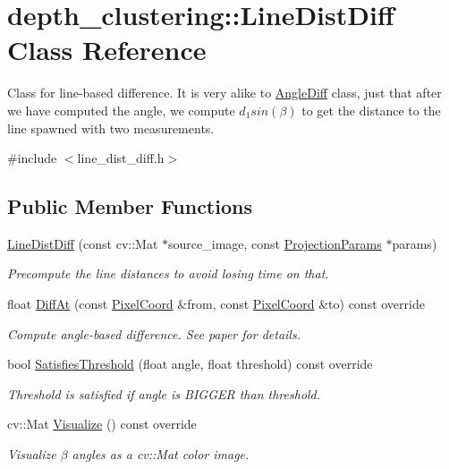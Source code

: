 \hypertarget{classdepth__clustering_1_1LineDistDiff}{}\section{depth\+\_\+clustering\+:\+:Line\+Dist\+Diff Class Reference}
\label{classdepth__clustering_1_1LineDistDiff}


Class for line-\/based difference. It is very alike to \hyperlink{classdepth__clustering_1_1AngleDiff}{Angle\+Diff} class, just that after we have computed the angle, we compute $d_1 sin(\beta)$ to get the distance to the line spawned with two measurements.  




{\ttfamily \#include $<$line\+\_\+dist\+\_\+diff.\+h$>$}

\subsection*{Public Member Functions}
\begin{DoxyCompactItemize}
\item 
\hyperlink{classdepth__clustering_1_1LineDistDiff_af922d3e19bc52a2fdbf36317fc474d88}{Line\+Dist\+Diff} (const cv\+::\+Mat $\ast$source\+\_\+image, const \hyperlink{classdepth__clustering_1_1ProjectionParams}{Projection\+Params} $\ast$params)
\begin{DoxyCompactList}\small\item\em Precompute the line distances to avoid losing time on that. \end{DoxyCompactList}\item 
float \hyperlink{classdepth__clustering_1_1LineDistDiff_a839eee44b14de26d85e6dbad5e37b356}{Diff\+At} (const \hyperlink{structdepth__clustering_1_1PixelCoord}{Pixel\+Coord} \&from, const \hyperlink{structdepth__clustering_1_1PixelCoord}{Pixel\+Coord} \&to) const override
\begin{DoxyCompactList}\small\item\em Compute angle-\/based difference. See paper for details. \end{DoxyCompactList}\item 
\mbox{\label{classdepth__clustering_1_1LineDistDiff_ae9debede2cffd6bb40ca4c4a82c52f61}} 
bool \hyperlink{classdepth__clustering_1_1LineDistDiff_ae9debede2cffd6bb40ca4c4a82c52f61}{Satisfies\+Threshold} (float angle, float threshold) const override
\begin{DoxyCompactList}\small\item\em Threshold is satisfied if angle is B\+I\+G\+G\+ER than threshold. \end{DoxyCompactList}\item 
cv\+::\+Mat \hyperlink{classdepth__clustering_1_1LineDistDiff_a7feaf820589ccfb47786d5124a74d725}{Visualize} () const override
\begin{DoxyCompactList}\small\item\em Visualize $\beta$ angles as a {\ttfamily cv\+::\+Mat} color image. \end{DoxyCompactList}\end{DoxyCompactItemize}
